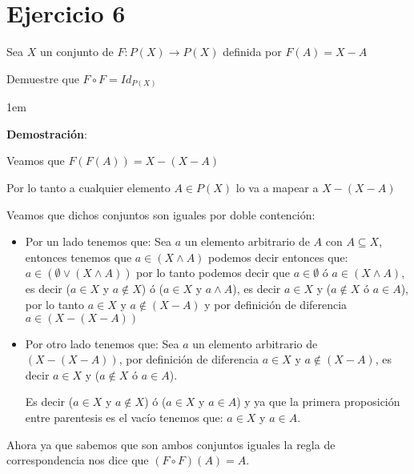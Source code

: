 \documentclass[12pt, fleqn]{article}                             %
\newenvironment{SmallIndentation}[1][0.75em]                    %
    {\begin{adjustwidth}{#1}{}\begin{footnotesize}}                 %
    {\end{footnotesize}\end{adjustwidth}}                           %
\begin{document}
\section{Ejercicio 6}

    Sea $X$ un conjunto de $F: P(X) \to P(X)$ definida por $F(A) = X - A$

    Demuestre que $F \circ F = Id_{P(X)}$

    \begin{SmallIndentation}[1em]
        \textbf{Demostración}:

        Veamos que $F(F(A)) = X - (X-A)$ 

        Por lo tanto a cualquier elemento $A \in P(X)$ lo va a mapear a $X - (X-A)$

        Veamos que dichos conjuntos son iguales por doble contención:

        \begin{itemize}
            \item Por un lado tenemos que:
                Sea $a$ un elemento arbitrario de $A$ con $A \subseteq X$, entonces
                tenemos que $a \in (X \land A)$ podemos decir entonces que:
                $a \in (\emptyset \lor (X \land A))$ por lo tanto podemos decir que $a \in \emptyset$ ó
                $a \in (X \land A)$, es decir ($a \in X$ y $a \notin X$) ó ($a \in X$ y $a \land A$), 
                es decir $a \in X$ y ($a \notin X$ ó $a \in A$), por lo tanto
                $a \in X$ y $a \notin (X-A)$ y por definición de diferencia $a \in (X - (X-A))$

            \item Por otro lado tenemos que:
                Sea $a$ un elemento arbitrario de $(X - (X-A))$,
                por definición de diferencia $a \in X$ y $a \notin (X-A)$,
                es decir $a \in X$ y ($a \notin X$ ó $a \in A$).

                Es decir ($a \in X$ y $a \notin X$) ó ($a \in X$ y $a \in A$) y ya que
                la primera proposición entre parentesis es el vacío tenemos que:
                $a \in X$ y $a \in A$.
                    
        \end{itemize}


        Ahora ya que sabemos que son ambos conjuntos iguales la regla de correspondencia nos dice que
        $(F \circ F)(A) = A$.


\end{SmallIndentation}
\end{document}
